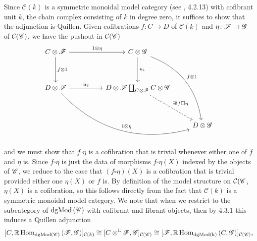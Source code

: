 \documentclass[dissertation.tex]{subfiles}
\begin{document}
\begin{rmk}
\begin{itemize}
    Since $\mathcal{C}(k)$ is a symmetric monoidal model category (see \cite{HoveyMC}, 4.2.13) with cofibrant unit $k$, the chain complex consisting of $k$ in degree zero, it suffices to show that the adjunction is Quillen.
    Given cofibrations $f \colon C \to D$ of $\mathcal{C}(k)$ and $\eta \colon \mathscr{F} \to \mathscr{G}$ of $\mathcal{C}(\mathscr{C})$,
    we have the pushout in $\mathcal{C}(\mathscr{C})$
    $$\begin{tikzcd}
      C \otimes \F \arrow{rr}{1 \otimes \eta}\arrow{dd}{f \otimes 1} && C \otimes \G \arrow{dd}{u_1}\arrow[bend left]{rdddd}{f \otimes 1}\\
      \\
      D \otimes \F \arrow{rr}{u_2}\arrow[bend right]{rrrdd}{1 \otimes \eta} && D \otimes \F \coprod_{C \otimes \F} C \otimes \G\arrow[dashed]{rdd}{\exists !f \square \eta}\\
      \\
      & & & D \otimes \G
    \end{tikzcd}$$
    and we must show that $f \square \eta$ is a cofibration that is trivial whenever either one of $f$ and $\eta$ is.
    Since $f \square \eta$ is just the data of morphisms $f \square \eta(X)$
    indexed by the objects of $\mathscr{C}$, we reduce to the case that $(f \square \eta)(X)$ is a cofibration that is trivial provided either one $\eta(X)$ or $f$ is.
    By definition of the model structure on $\mathcal{C}(\mathscr{C}$, $\eta(X)$ is a cofibration, so this follows directly from the fact that $\mathcal{C}(k)$ is a symmetric monoidal model category.
    We note that when we restrict to the subcategory of $\operatorname{dgMod\left(\mathscr{C}\right)}$ with cofibrant and fibrant objects, then by \cite{HoveyMC} 4.3.1 this induces a Quillen adjunction 
    $$[C,\mathbb{R}\operatorname{Hom}_{\operatorname{dgMod\left(\mathscr{C}\right)}}\left(\mathscr{F},\mathscr{G}\right)]_{\mathcal{C}(k)}
    \cong [C \otimes^\mathbb{L} \mathscr{F}, \mathscr{G}]_{\mathcal{C}(\mathscr{C})}
    \cong [\mathscr{F}, \mathbb{R}\operatorname{Hom}_{\operatorname{dgMod\left(k\right)}}\left(C,\mathscr{G}\right)]_{\mathcal{C}(\mathscr{C})},$$

\end{itemize}
\end{rmk}
\end{document}
